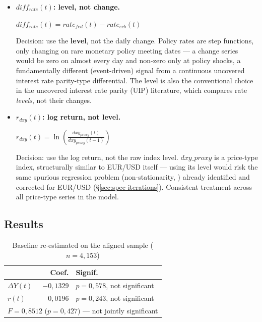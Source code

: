 \documentclass[12pt,a4paper]{article}
\begin{document}
\vspace{0.3cm}
\begin{itemize}
	\item \textbf{	$diff_{rate}(t)$: level, not change.}
	
	
	\begin{center}
		{\large$diff_{rate}(t) = rate_{fed}(t)- rate_{ecb}(t)$}
	\end{center}
	
	
	
	Decision: use the \textbf{level}, not the daily
	change. Policy rates are step functions, only changing on rare
	monetary policy meeting dates --- a change series would be zero on
	almost every day and non-zero only at policy shocks, a fundamentally
	different (event-driven) signal from a continuous uncovered
	interest rate parity-type differential. The level is also the conventional choice in
	the uncovered interest rate parity (UIP) literature, which
	compares rate \emph{levels}, not their changes.
	

\newpage

	\item \textbf{$r_{dxy}(t)$: log return, not level.}
	
	
	\begin{center}
		{\large$r_{dxy}(t) = \ln\left(\frac{dxy_{proxy}(t)}{dxy_{proxy}(t-1)}\right)$}
	\end{center}
	
	
	
	
	
	Decision: use the log return, not the raw index
	level. \texttt{$dxy\_proxy$} is a price-type index, structurally
	similar to EUR/USD itself --- using its level would risk the
	same spurious regression problem (non-stationarity,
	\citep{grangernewbold1974}) already identified and corrected for EUR/USD
	(\S\ref{sec:spec-iterations}). Consistent treatment across all
	price-type series in the model.
\end{itemize}





\subsection{Results}

\begin{table}[H]
	\centering
	\small
	\caption{Baseline re-estimated on the aligned sample ($n=4,153$)}
	\begin{tabular}{lrl}
		\toprule
		& Coef. & Signif. \\
		\midrule
		$\Delta Y(t)$ & $-0{,}1329$ & $p=0{,}578$, not significant \\
		$r(t)$ & $0{,}0196$ & $p=0{,}243$, not significant \\
		\midrule
		\multicolumn{3}{l}{$F=0{,}8512$ ($p=0{,}427$) --- not jointly significant} \\
		\bottomrule
	\end{tabular}
\end{table}
\end{document}
